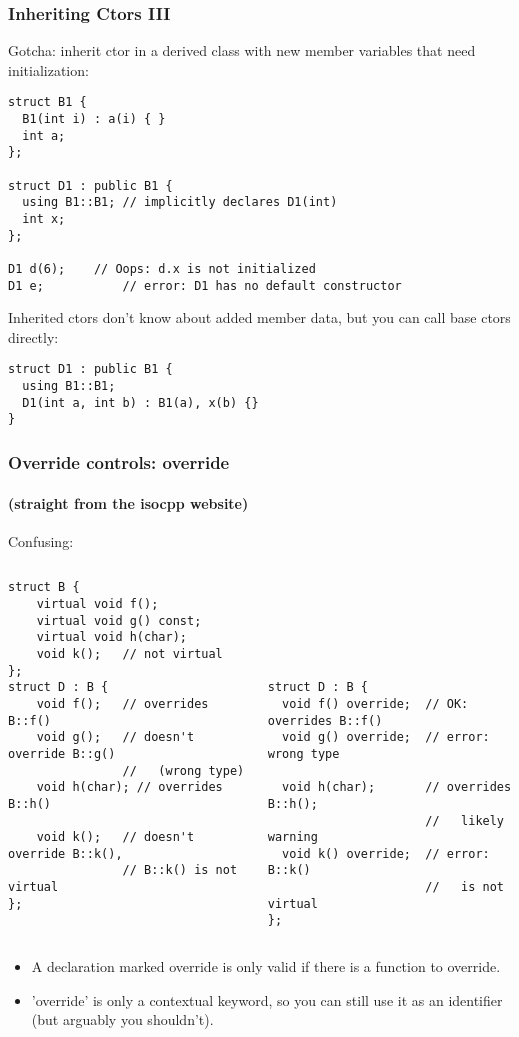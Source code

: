 \begin{frame}[fragile]
\frametitle{Inheriting Ctors III}
Gotcha: inherit ctor in a derived class with new member variables that
need initialization:

{\scriptsize
\begin{verbatim}
struct B1 {
  B1(int i) : a(i) { }
  int a;
};

struct D1 : public B1 {
  using B1::B1; // implicitly declares D1(int)
  int x;
};

D1 d(6);	// Oops: d.x is not initialized
D1 e;           // error: D1 has no default constructor
\end{verbatim}
}

Inherited ctors don't know about added member data, but you can call
base ctors directly:
{\scriptsize
\begin{verbatim}
struct D1 : public B1 {
  using B1::B1;
  D1(int a, int b) : B1(a), x(b) {}
}
\end{verbatim}
}

\end{frame}


\begin{frame}[fragile]
\frametitle{Override controls: override}
\framesubtitle{(straight from the isocpp website)}
Confusing:
\begin{columns}[t]
{\scriptsize
\begin{verbatim}
struct B {
    virtual void f();
    virtual void g() const;
    virtual void h(char);
    void k();   // not virtual
};
struct D : B {
    void f();   // overrides B::f()
    void g();   // doesn't override B::g() 
                //   (wrong type)
    void h(char); // overrides B::h()

    void k();   // doesn't override B::k(), 
                // B::k() is not virtual
};
\end{verbatim}
}
\pause{}
{\scriptsize
\begin{verbatim}
 
 
 
 
 

struct D : B {
  void f() override;  // OK: overrides B::f()
  void g() override;  // error: wrong type

  void h(char);       // overrides B::h(); 
                      //   likely warning
  void k() override;  // error: B::k() 
                      //   is not virtual
};
\end{verbatim}
}
\end{columns}
\pause{}
\begin{itemize}
\item A declaration marked override is only valid if there is a function to override.
\item 'override' is only a contextual keyword, so you can still use it
  as an identifier (but arguably you shouldn't).
\end{itemize}
\end{frame}


